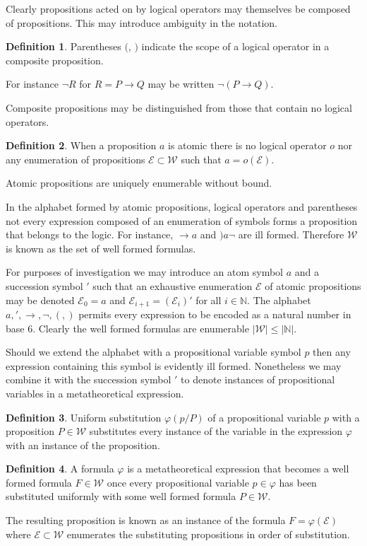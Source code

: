 \documentclass{amsbook}
\newcommand{\wffs}{\mathcal W}
\newcommand{\then}{\mathrel\rightarrow}
\theoremstyle{definition}
\newtheorem{dfn}{Definition}[section]
\begin{document}
Clearly propositions acted on by logical operators may themselves be composed of propositions. This may introduce ambiguity in the notation.

\begin{dfn}
    Parentheses $($, $)$ indicate the scope of a logical operator in a composite proposition.
\end{dfn}

For instance $\neg R$ for $R = P \then Q$ may be written $\neg(P \then Q)$.

Composite propositions may be distinguished from those that contain no logical operators.

\begin{dfn}
    When a proposition $a$ is atomic there is no logical operator $o$ nor any enumeration of propositions $\mathcal E \subset \wffs$ such that $a = o(\mathcal E)$.
\end{dfn}

Atomic propositions are uniquely enumerable without bound.

In the alphabet formed by atomic propositions, logical operators and parentheses not every expression composed of an enumeration of symbols forms a proposition that belongs to the logic. For instance, $\then a$ and $)a \neg$ are ill formed. Therefore $\mathcal W$ is known as the set of well formed formulas.

For purposes of investigation we may introduce an atom symbol $a$ and a succession symbol $'$ such that an exhaustive enumeration $\mathcal E$ of atomic propositions may be denoted $\mathcal E_0 = a$ and $\mathcal E_{i+1} = (\mathcal E_i)'$ for all $i \in \mathbb N$. The alphabet $a, ', \then, \neg, (, )$ permits every expression to be encoded as a natural number in base $6$. Clearly the well formed formulas are enumerable $|\wffs| \leq |\mathbb N|$.

Should we extend the alphabet with a propositional variable symbol $p$ then any expression containing this symbol is evidently ill formed. Nonetheless we may combine it with the succession symbol $'$ to denote instances of propositional variables in a metatheoretical expression.

\begin{dfn}
    Uniform substitution $\varphi(p / P)$ of a propositional variable $p$ with a proposition $P \in \wffs$ substitutes every instance of the variable in the expression $\varphi$ with an instance of the proposition.
\end{dfn}

\begin{dfn}
    A formula $\varphi$ is a metatheoretical expression that becomes a well formed formula $F \in \wffs$ once every propositional variable $p \in \varphi$ has been substituted uniformly with some well formed formula $P \in \wffs$.

    The resulting proposition is known as an instance of the formula $F = \varphi(\mathcal E)$ where $\mathcal E \subset \wffs$ enumerates the substituting propositions in order of substitution.
\end{dfn}
\end{document}
